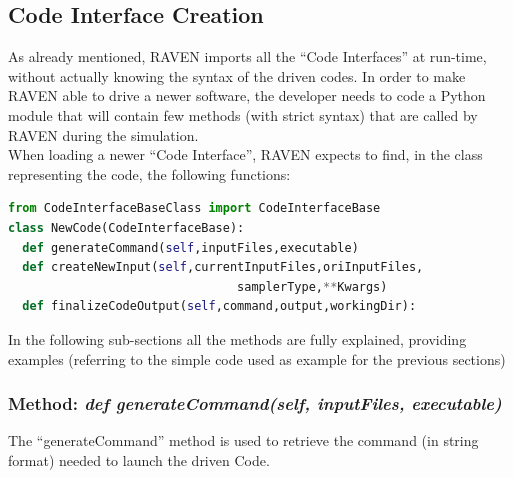 \subsection{Code Interface Creation} 
\label{subsec:codeinterfacecreation}
As already mentioned, RAVEN imports all the ``Code Interfaces'' at run-time, 
without actually knowing the syntax of the driven codes. In order to make RAVEN
able to drive a newer software, the developer needs to code a Python module 
that will contain few methods (with strict syntax) that are called by RAVEN during the simulation.
\\ When loading a newer ``Code Interface'', RAVEN expects to find, in the class representing the code,
 the following functions:
\begin{lstlisting}[language=python]
from CodeInterfaceBaseClass import CodeInterfaceBase
class NewCode(CodeInterfaceBase):
  def generateCommand(self,inputFiles,executable)
  def createNewInput(self,currentInputFiles,oriInputFiles,
                                samplerType,**Kwargs)                           
  def finalizeCodeOutput(self,command,output,workingDir):
\end{lstlisting} 
In the following sub-sections all the methods are fully explained, providing examples
 (referring to the simple code used as example for the previous sections)
\subsubsection{Method: \textit{def generateCommand(self, inputFiles, executable)}} 
\label{subsubsec:generateCommand}
The ``generateCommand'' method is used to retrieve the command 
(in string format) needed to launch the driven Code.


